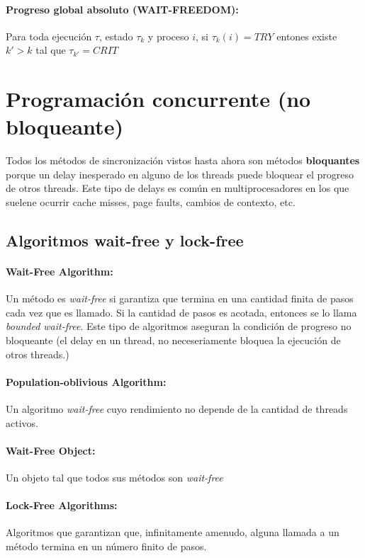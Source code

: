 \paragraph{Progreso global absoluto (WAIT-FREEDOM):} Para toda ejecución $\tau$, estado $\tau_{k}$ y proceso $i$, si $\tau_{k}(i) = TRY$ entones existe $k' > k$ tal que $\tau_{k'} = CRIT$

\printbibliography[keyword=sincro,title=Bibliografía]

\newpage
\section{Programación concurrente (no bloqueante)}
Todos los métodos de sincronización vistos hasta ahora son métodos \textbf{bloquantes} porque un delay inesperado en alguno de los threads puede bloquear el progreso de otros threads. Este tipo de delays es común en multiprocesadores en los que suelene ocurrir cache misses, page faults, cambios de contexto, etc.

\subsection{Algoritmos wait-free y lock-free}
\paragraph{Wait-Free Algorithm:} Un método es \textit{wait-free} si garantiza que termina en una cantidad finita de pasos cada vez que es llamado. Si la cantidad de pasos es acotada, entonces se lo llama \textit{bounded wait-free}. Este tipo de algoritmos aseguran la condición de progreso no bloqueante (el delay en un thread, no neceseriamente bloquea la ejecución de otros threads.)

\paragraph{Population-oblivious Algorithm:} Un algoritmo \textit{wait-free} cuyo rendimiento no depende de la cantidad de threads activos.

\paragraph{Wait-Free Object:} Un objeto tal que todos sus métodos son \textit{wait-free}

\paragraph{Lock-Free Algorithms:} Algoritmos que garantizan que, infinitamente amenudo, alguna llamada a un método termina en un número finito de pasos. 

